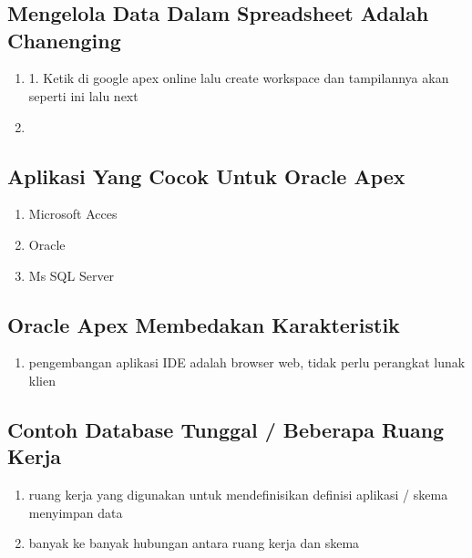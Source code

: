 \chapter{}

\section{Mengelola Data Dalam Spreadsheet Adalah Chanenging}
\begin{enumerate}
    \item 1.	Ketik di google apex online lalu create workspace dan tampilannya akan seperti ini lalu next
    
    \item 

\end{enumerate}


\section{Aplikasi Yang Cocok Untuk Oracle Apex}
\begin{enumerate}
\item Microsoft Acces
\item Oracle
\item Ms SQL Server
\end{enumerate}

\section{Oracle Apex Membedakan Karakteristik}
\begin{enumerate}
\item pengembangan aplikasi IDE adalah browser web, tidak perlu perangkat lunak klien

\end{enumerate}

\section{Contoh Database Tunggal / Beberapa Ruang Kerja}
\begin{enumerate}
    \item ruang kerja yang digunakan untuk mendefinisikan definisi aplikasi / skema menyimpan data
  \item banyak ke banyak hubungan antara ruang kerja dan skema
 
\end{enumerate}